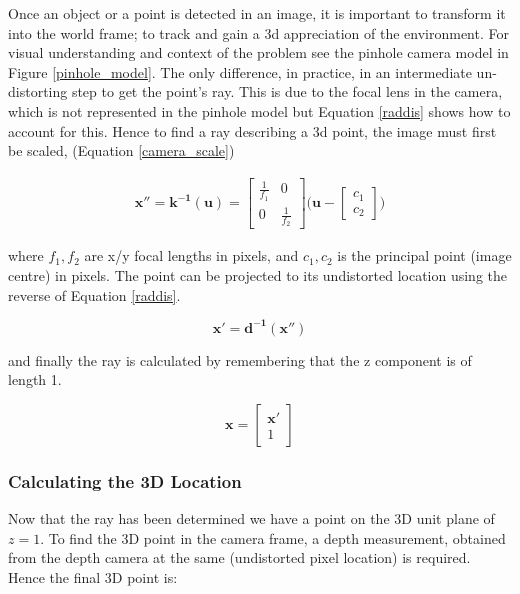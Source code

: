 \documentclass[11pt,twoside]{report}
\begin{document}
Once an object or a point is detected in an image, it is important to transform it into the world frame; to track and gain a 3d appreciation of the environment. For visual understanding and context  of the problem see the pinhole camera model in Figure \ref{pinhole_model}. The only difference, in practice, in an intermediate un-distorting step to get the point's ray. This is due to the focal lens in the camera, which is not represented in the pinhole model but Equation \ref{raddis} shows how to account for this. Hence to find a ray describing a 3d point, the image must first be scaled, (Equation \ref{camera_scale})


\begin{equation}
\begin{aligned}
\mathbf{x''} = \mathbf{k^{-1}(u)} = 
\begin{bmatrix}
\frac{1}{f_{1}} & 0 \\[0.3em]
0 & \frac{1}{f_{2}}
\end{bmatrix}
\bigg (
\mathbf{u} -
\begin{bmatrix}
c_{1} \\[0.3em]
c_{2}
\end{bmatrix}
\bigg )
\end{aligned}
\label{camera_scale}
\end{equation}

where $f_{1},f_{2}$ are x/y focal lengths in pixels, and $c_{1},c_{2}$ is the principal point (image centre) in pixels. The point can be projected to its undistorted location using the reverse of Equation \ref{raddis}.

\begin{equation}
\mathbf{x'} = \mathbf{d^{-1}(x'')}
\label{camera_scale2}
\end{equation}

and finally the ray is calculated by remembering that the z component is of length 1.

\begin{equation}
\mathbf{x} = 
\begin{bmatrix}
\mathbf{x'} \\
1
\end{bmatrix}
\label{to_3d_ray}
\end{equation}

\subsubsection{Calculating the 3D Location}

Now that the ray has been determined we have a point on the 3D unit plane of $z=1$. To find the 3D point in the camera frame, a depth measurement, obtained from the depth camera at the same (undistorted pixel location) is required. Hence the final 3D point is:
\end{document}
